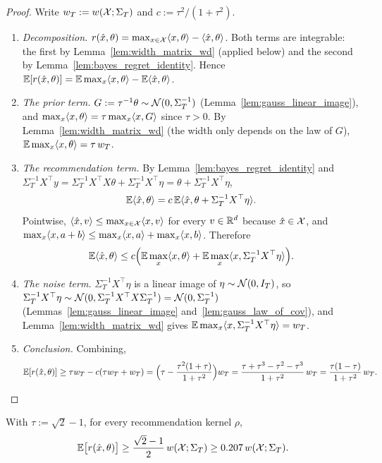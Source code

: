 \begin{proof}
\leanok
{}
Write $w_T := w(\mathcal{X};\Sigma_T)$ and $c := \tau^2/(1+\tau^2)$.
\begin{enumerate}
  \item[(i)] \emph{Decomposition.} $r(\hat{x},\theta) = \max_{x\in\mathcal{X}}\langle x, \theta \rangle - \langle \hat{x}, \theta \rangle$.
    Both terms are integrable: the first by Lemma~\ref{lem:width_matrix_wd} (applied below)
    and the second by Lemma~\ref{lem:bayes_regret_identity}. Hence
    $\mathbb{E}[r(\hat{x},\theta)] = \mathbb{E}\max_x\langle x, \theta \rangle - \mathbb{E}\langle \hat{x}, \theta \rangle$.
  \item[(ii)] \emph{The prior term.} $G := \tau^{-1}\theta \sim \mathcal{N}(0, \Sigma_T^{-1})$
    (Lemma~\ref{lem:gauss_linear_image}), and $\max_x\langle x, \theta \rangle = \tau\max_x\langle x, G \rangle$
    since $\tau > 0$. By Lemma~\ref{lem:width_matrix_wd} (the width only depends on the law
    of $G$), $\mathbb{E}\max_x\langle x, \theta \rangle = \tau\,w_T$.
  \item[(iii)] \emph{The recommendation term.} By Lemma~\ref{lem:bayes_regret_identity} and
    $\Sigma_T^{-1}X^\top y = \Sigma_T^{-1}X^\top X\theta + \Sigma_T^{-1}X^\top\eta
    = \theta + \Sigma_T^{-1}X^\top\eta$,
    \[
      \mathbb{E}\langle \hat{x}, \theta \rangle = c\,\mathbb{E}\langle \hat{x}, \theta + \Sigma_T^{-1}X^\top\eta \rangle .
    \]
    Pointwise, $\langle \hat{x}, v \rangle \le \max_{x\in\mathcal{X}}\langle x, v \rangle$ for every $v \in \mathbb{R}^d$ because
    $\hat{x} \in \mathcal{X}$, and $\max_x\langle x, a+b \rangle \le \max_x\langle x, a \rangle + \max_x\langle x, b \rangle$. Therefore
    \[
      \mathbb{E}\langle \hat{x}, \theta \rangle \le c\Big( \mathbb{E}\max_x\langle x, \theta \rangle + \mathbb{E}\max_x\langle x, \Sigma_T^{-1}X^\top\eta \rangle \Big).
    \]
  \item[(iv)] \emph{The noise term.} $\Sigma_T^{-1}X^\top\eta$ is a linear image of
    $\eta \sim \mathcal{N}(0, I_T)$, so $\Sigma_T^{-1}X^\top\eta \sim
    \mathcal{N}(0, \Sigma_T^{-1}X^\top X \Sigma_T^{-1}) = \mathcal{N}(0, \Sigma_T^{-1})$
    (Lemmas~\ref{lem:gauss_linear_image} and~\ref{lem:gauss_law_of_cov}), and
    Lemma~\ref{lem:width_matrix_wd} gives $\mathbb{E}\max_x\langle x, \Sigma_T^{-1}X^\top\eta \rangle = w_T$.
  \item[(v)] \emph{Conclusion.} Combining,
    \[
      \mathbb{E}[r(\hat{x},\theta)] \ge \tau w_T - c(\tau w_T + w_T)
      = \Big(\tau - \frac{\tau^2(1+\tau)}{1+\tau^2}\Big) w_T
      = \frac{\tau + \tau^3 - \tau^2 - \tau^3}{1+\tau^2}\, w_T
      = \frac{\tau(1-\tau)}{1+\tau^2}\, w_T .
    \]
\end{enumerate}
\end{proof}

\begin{lemma}\label{lem:bayes_regret_lower_opt}
\leanok
{}
With $\tau := \sqrt2 - 1$, for every recommendation kernel $\rho$,
\[
  \mathbb{E}\big[ r(\hat{x},\theta) \big] \ge \frac{\sqrt2 - 1}{2}\,w(\mathcal{X};\Sigma_T)
  \ge 0.207\,w(\mathcal{X};\Sigma_T) .
\]
\end{lemma}

